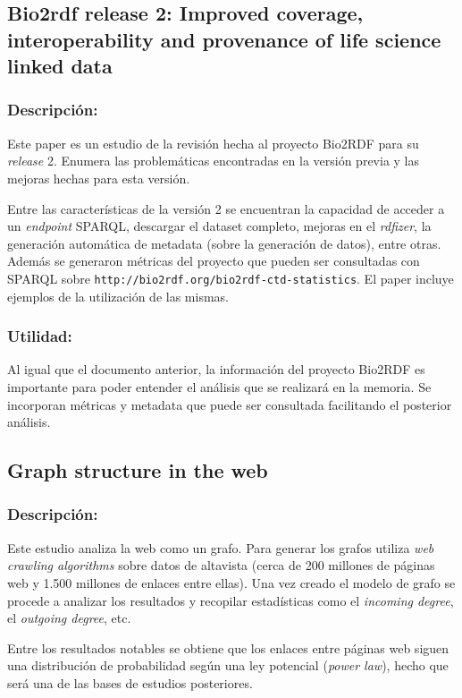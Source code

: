 \documentclass[spanish, fleqn]{article}
\begin{document}
\subsection{Bio2rdf release 2: Improved coverage, interoperability and provenance of life science linked data\cite{callahan2013bio2rdf}}
\subsubsection*{Descripción:}
Este paper es un estudio de la revisión hecha al proyecto Bio2RDF para su
\emph{release} 2. Enumera las problemáticas encontradas en la versión previa y
las mejoras hechas para esta versión.

Entre las características de la versión 2 se encuentran la capacidad de acceder
a un \emph{endpoint} SPARQL, descargar el dataset completo, mejoras en el
\emph{rdfizer}, la generación automática de metadata (sobre la generación de
datos), entre otras.
Además se generaron métricas del proyecto que pueden ser consultadas con SPARQL 
sobre \texttt{http://bio2rdf.org/bio2rdf-ctd-statistics}. El paper incluye
ejemplos de la utilización de las mismas.

\subsubsection*{Utilidad:}
Al igual que el documento anterior, la información del proyecto Bio2RDF es
importante para poder entender el análisis que se realizará en la memoria. Se
incorporan métricas y metadata que puede ser consultada facilitando el posterior
análisis. 

\subsection{Graph structure in the web\cite{broder2000graph}}
\subsubsection*{Descripción:}
Este estudio analiza la web como un grafo. Para generar los grafos utiliza 
\emph{web crawling algorithms} sobre datos de altavista (cerca de 200 millones
de páginas web y 1.500 millones de enlaces entre ellas). Una vez creado el
modelo de grafo se procede a analizar los resultados y recopilar estadísticas
como el \emph{incoming degree}, el \emph{outgoing degree}, etc.

Entre los resultados notables se obtiene que los enlaces entre páginas web
siguen una distribución de probabilidad según una ley potencial (\emph{power
law}), hecho que será una de las bases de estudios posteriores.
\end{document}
